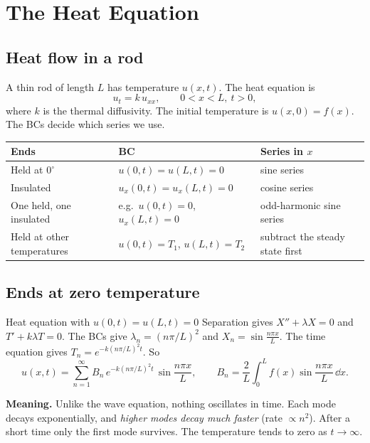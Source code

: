 \chapter{The Heat Equation}

\section{Heat flow in a rod}

A thin rod of length $L$ has temperature $u(x,t)$. The heat equation is
\[ u_t = k\,u_{xx}, \qquad 0<x<L,\ t>0, \]
where $k$ is the thermal diffusivity. The initial temperature is $u(x,0)=f(x)$. The BCs decide which series we use.

\begin{center}
\renewcommand{\arraystretch}{1.4}
\begin{tabular}{@{}lll@{}}
\toprule
Ends & BC & Series in $x$ \\
\midrule
Held at $0^\circ$ & $u(0,t)=u(L,t)=0$ & sine series \\
Insulated & $u_x(0,t)=u_x(L,t)=0$ & cosine series \\
One held, one insulated & e.g.\ $u(0,t)=0$, $u_x(L,t)=0$ & odd-harmonic sine series \\
Held at other temperatures & $u(0,t)=T_1$, $u(L,t)=T_2$ & subtract the steady state first \\
\bottomrule
\end{tabular}
\end{center}

\section{Ends at zero temperature}

\begin{methodbox}{Heat equation with $u(0,t)=u(L,t)=0$}
Separation gives $X''+\lambda X=0$ and $T'+k\lambda T=0$. The BCs give $\lambda_n = (n\pi/L)^2$ and $X_n = \sin\frac{n\pi x}{L}$. The time equation gives $T_n = e^{-k(n\pi/L)^2t}$. So
\[ u(x,t) = \sum_{n=1}^\infty B_n\,e^{-k(n\pi/L)^2t}\,\sin\frac{n\pi x}{L},\qquad B_n = \frac2L\int_0^Lf(x)\sin\frac{n\pi x}{L}\,\dd x. \]
\end{methodbox}

\textbf{Meaning.} Unlike the wave equation, nothing oscillates in time. Each mode decays exponentially, and \emph{higher modes decay much faster} (rate $\propto n^2$). After a short time only the first mode survives. The temperature tends to zero as $t\to\infty$.

